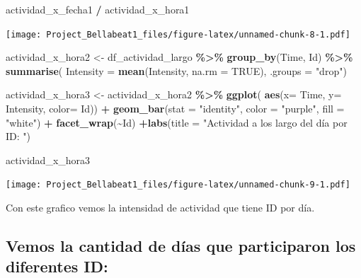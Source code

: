 \documentclass[
]{article}
\newenvironment{Shaded}{\begin{snugshade}}{\end{snugshade}}
\newcommand{\AttributeTok}[1]{\textcolor[rgb]{0.13,0.29,0.53}{#1}}
\newcommand{\ConstantTok}[1]{\textcolor[rgb]{0.56,0.35,0.01}{#1}}
\newcommand{\FunctionTok}[1]{\textcolor[rgb]{0.13,0.29,0.53}{\textbf{#1}}}
\newcommand{\NormalTok}[1]{#1}
\newcommand{\OtherTok}[1]{\textcolor[rgb]{0.56,0.35,0.01}{#1}}
\newcommand{\SpecialCharTok}[1]{\textcolor[rgb]{0.81,0.36,0.00}{\textbf{#1}}}
\newcommand{\StringTok}[1]{\textcolor[rgb]{0.31,0.60,0.02}{#1}}
\begin{document}
\begin{Shaded}
\begin{Highlighting}[]
\NormalTok{actividad\_x\_fecha1 }\SpecialCharTok{/}\NormalTok{ actividad\_x\_hora1}
\end{Highlighting}
\end{Shaded}

\texttt{[image: Project\_Bellabeat1\_files/figure-latex/unnamed-chunk-8-1.pdf]}

\begin{Shaded}
\begin{Highlighting}[]
\NormalTok{actividad\_x\_hora2 }\OtherTok{\textless{}{-}}\NormalTok{ df\_actividad\_largo }\SpecialCharTok{\%\textgreater{}\%} \FunctionTok{group\_by}\NormalTok{(Time, Id) }\SpecialCharTok{\%\textgreater{}\%} 
  \FunctionTok{summarise}\NormalTok{( }\AttributeTok{Intensity =} \FunctionTok{mean}\NormalTok{(Intensity, }\AttributeTok{na.rm =} \ConstantTok{TRUE}\NormalTok{), }\AttributeTok{.groups =} \StringTok{"drop"}\NormalTok{)}

\NormalTok{actividad\_x\_hora3 }\OtherTok{\textless{}{-}}\NormalTok{  actividad\_x\_hora2 }\SpecialCharTok{\%\textgreater{}\%} \FunctionTok{ggplot}\NormalTok{( }\FunctionTok{aes}\NormalTok{(}\AttributeTok{x=}\NormalTok{ Time, }\AttributeTok{y=}\NormalTok{ Intensity, }\AttributeTok{color=}\NormalTok{ Id)) }\SpecialCharTok{+} \FunctionTok{geom\_bar}\NormalTok{(}\AttributeTok{stat =} \StringTok{"identity"}\NormalTok{, }\AttributeTok{color =} \StringTok{"purple"}\NormalTok{, }\AttributeTok{fill =} \StringTok{"white"}\NormalTok{) }\SpecialCharTok{+} \FunctionTok{facet\_wrap}\NormalTok{(}\SpecialCharTok{\textasciitilde{}}\NormalTok{Id) }\SpecialCharTok{+}\FunctionTok{labs}\NormalTok{(}\AttributeTok{title =} \StringTok{"Actividad a los largo del día por ID: "}\NormalTok{)}

\NormalTok{actividad\_x\_hora3}
\end{Highlighting}
\end{Shaded}

\texttt{[image: Project\_Bellabeat1\_files/figure-latex/unnamed-chunk-9-1.pdf]}

Con este grafico vemos la intensidad de actividad que tiene ID por día.

\subsection{Vemos la cantidad de días que participaron los diferentes
ID:}\label{vemos-la-cantidad-de-duxedas-que-participaron-los-diferentes-id}

\begin{Shaded}
\end{Shaded}
\end{document}
